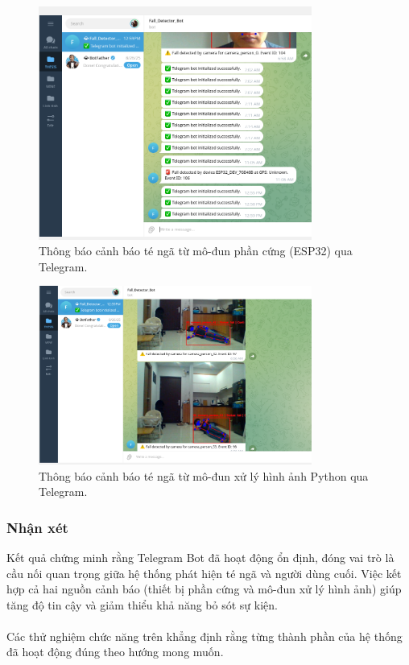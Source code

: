 \begin{figure}[H]
    \centering
    \includegraphics[width=0.8\textwidth]{figures/telegram_fall_module1_send.png}
    \caption{Thông báo cảnh báo té ngã từ mô-đun phần cứng (ESP32) qua Telegram.}
    \label{fig:telegram_hw}
\end{figure}

\begin{figure}[H]
    \centering
    \includegraphics[width=0.8\textwidth]{figures/telegram_python_fall_send.png}
    \caption{Thông báo cảnh báo té ngã từ mô-đun xử lý hình ảnh Python qua Telegram.}
    \label{fig:telegram_python}
\end{figure}

\subsubsection*{Nhận xét}
Kết quả chứng minh rằng Telegram Bot đã hoạt động ổn định, đóng vai trò là cầu nối quan trọng giữa hệ thống phát hiện té ngã và người dùng cuối.  
Việc kết hợp cả hai nguồn cảnh báo (thiết bị phần cứng và mô-đun xử lý hình ảnh) giúp tăng độ tin cậy và giảm thiểu khả năng bỏ sót sự kiện.
\paragraph{}  
Các thử nghiệm chức năng trên khẳng định rằng từng thành phần của hệ thống đã hoạt động đúng theo hướng mong muốn.
